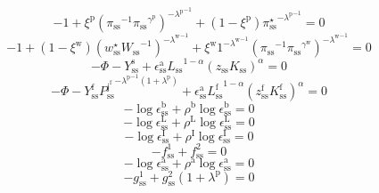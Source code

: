 \begin{equation}
-1 + {\xi^{\mathrm{p}}} {\left({\pi_\mathrm{ss}}^{-1} {{\pi_\mathrm{ss}}^{\gamma^{\mathrm{p}}}}\right)^{-{\lambda^{\mathrm{p}}}^{-1}}} + \left(1 - \xi^{\mathrm{p}}\right) {{\pi^{\star}_\mathrm{ss}}^{-{\lambda^{\mathrm{p}}}^{-1}}} = 0
\end{equation}
\begin{equation}
-1 + \left(1 - \xi^{\mathrm{w}}\right) {\left({w^{\star}_\mathrm{ss}} {W_\mathrm{ss}}^{-1}\right)^{-{\lambda^{\mathrm{w}}}^{-1}}} + {\xi^{\mathrm{w}}} {{1}^{-{\lambda^{\mathrm{w}}}^{-1}}} {\left({\pi_\mathrm{ss}}^{-1} {{\pi_\mathrm{ss}}^{\gamma^{\mathrm{w}}}}\right)^{-{\lambda^{\mathrm{w}}}^{-1}}} = 0
\end{equation}
\begin{equation}
-\Phi - Y^{\mathrm{s}}_\mathrm{ss} + {\epsilon^{\mathrm{a}}_\mathrm{ss}} {{L_\mathrm{ss}}^{1 - \alpha}} {\left({z_\mathrm{ss}} {K_\mathrm{ss}}\right)^{\alpha}} = 0
\end{equation}
\begin{equation}
-\Phi - {Y^{\mathrm{f}}_\mathrm{ss}} {{P^{\mathrm{j}^{\mathrm{f}}}_\mathrm{ss}}^{-{\lambda^{\mathrm{p}}}^{-1} \left(1 + \lambda^{\mathrm{p}}\right)}} + {\epsilon^{\mathrm{a}}_\mathrm{ss}} {{L^{\mathrm{f}}_\mathrm{ss}}^{1 - \alpha}} {\left({z^{\mathrm{f}}_\mathrm{ss}} {K^{\mathrm{f}}_\mathrm{ss}}\right)^{\alpha}} = 0
\end{equation}
\begin{equation}
-\log{\epsilon^{\mathrm{b}}_\mathrm{ss}} + {\rho^{\mathrm{b}}} {\log{\epsilon^{\mathrm{b}}_\mathrm{ss}}} = 0
\end{equation}
\begin{equation}
-\log{\epsilon^{\mathrm{L}}_\mathrm{ss}} + {\rho^{\mathrm{L}}} {\log{\epsilon^{\mathrm{L}}_\mathrm{ss}}} = 0
\end{equation}
\begin{equation}
-\log{\epsilon^{\mathrm{I}}_\mathrm{ss}} + {\rho^{\mathrm{I}}} {\log{\epsilon^{\mathrm{I}}_\mathrm{ss}}} = 0
\end{equation}
\begin{equation}
-f^{\mathrm{1}}_\mathrm{ss} + f^{\mathrm{2}}_\mathrm{ss} = 0
\end{equation}
\begin{equation}
-\log{\epsilon^{\mathrm{a}}_\mathrm{ss}} + {\rho^{\mathrm{a}}} {\log{\epsilon^{\mathrm{a}}_\mathrm{ss}}} = 0
\end{equation}
\begin{equation}
-g^{\mathrm{1}}_\mathrm{ss} + {g^{\mathrm{2}}_\mathrm{ss}} \left(1 + \lambda^{\mathrm{p}}\right) = 0
\end{equation}
